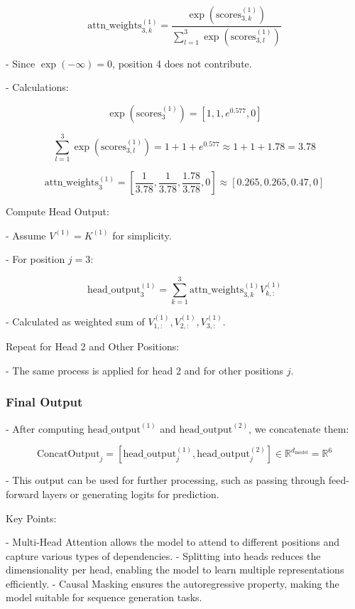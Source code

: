 \documentclass{article}
\begin{document}
  \[
  \text{attn\_weights}^{(1)}_{3,k} = \frac{\exp(\text{scores}^{(1)}_{3,k})}{\sum_{l=1}^{3} \exp(\text{scores}^{(1)}_{3,l})}
  \]

- Since \( \exp(-\infty) = 0 \), position 4 does not contribute.

- Calculations:

  \[
  \exp(\text{scores}^{(1)}_{3}) = [1, 1, e^{0.577}, 0]
  \]

  \[
  \sum_{l=1}^{3} \exp(\text{scores}^{(1)}_{3,l}) = 1 + 1 + e^{0.577} \approx 1 + 1 + 1.78 = 3.78
  \]

  \[
  \text{attn\_weights}^{(1)}_{3} = \left[ \frac{1}{3.78}, \frac{1}{3.78}, \frac{1.78}{3.78}, 0 \right] \approx [0.265, 0.265, 0.47, 0]
  \]

Compute Head Output:

- Assume \( V^{(1)} = K^{(1)} \) for simplicity.

- For position \( j = 3 \):

  \[
  \text{head\_output}^{(1)}_{3} = \sum_{k=1}^{3} \text{attn\_weights}^{(1)}_{3,k} V^{(1)}_{k,:}
  \]

- Calculated as weighted sum of \( V^{(1)}_{1,:}, V^{(1)}_{2,:}, V^{(1)}_{3,:} \).

Repeat for Head 2 and Other Positions:

- The same process is applied for head 2 and for other positions \( j \).

\subsubsection{Final Output}

- After computing \( \text{head\_output}^{(1)} \) and \( \text{head\_output}^{(2)} \), we concatenate them:

  \[
  \text{ConcatOutput}_{j} = [\text{head\_output}^{(1)}_{j}, \text{head\_output}^{(2)}_{j}] \in \mathbb{R}^{d_{\text{model}}} = \mathbb{R}^{6}
  \]

- This output can be used for further processing, such as passing through feed-forward layers or generating logits for prediction.

Key Points:

- Multi-Head Attention allows the model to attend to different positions and capture various types of dependencies.
- Splitting into heads reduces the dimensionality per head, enabling the model to learn multiple representations efficiently.
- Causal Masking ensures the autoregressive property, making the model suitable for sequence generation tasks.
\end{document}
